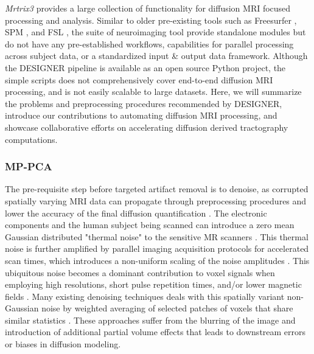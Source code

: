 \emph{Mrtrix3} provides a large collection of functionality for diffusion MRI focused processing and analysis. Similar to older pre-existing tools such as Freesurfer \cite{Fischl2012}, SPM \cite{penny_statistical_2006}, and FSL \cite{Jenkinson2012}, the suite of neuroimaging tool provide standalone modules but do not have any pre-established workflows, capabilities for parallel processing across subject data, or a standardized input \& output data framework. Although the DESIGNER pipeline is available as an open source Python project, the simple scripts does not comprehensively cover end-to-end diffusion MRI processing, and is not easily scalable to large datasets. Here, we will summarize the problems and preprocessing procedures recommended by DESIGNER, introduce our contributions to automating diffusion MRI processing, and showcase collaborative efforts on accelerating diffusion derived tractography computations.

\subsubsection{MP-PCA}
The pre-requisite step before targeted artifact removal is to denoise, as corrupted spatially varying MRI data can propagate through preprocessing procedures and lower the accuracy of the final diffusion quantification \cite{vizioli_lowering_2021}. The electronic components and the human subject being scanned can introduce a zero mean Gaussian distributed "thermal noise" to the sensitive MR scanners \cite{hoult_signal--noise_1976,edelstein_intrinsic_1986}. This thermal noise is further amplified by parallel imaging acquisition protocols for accelerated scan times, which introduces a non-uniform scaling of the noise amplitudes \cite{pruessmann_sense_1999}. This ubiquitous noise becomes a dominant contribution to voxel signals when employing high resolutions, short pulse repetition times, and/or lower magnetic fields \cite{triantafyllou_comparison_2005,triantafyllou_physiological_2011}. Many existing denoising techniques deals with this spatially variant non-Gaussian noise by weighted averaging of selected patches of voxels that share similar statistics \cite{buades_2005,coupe_fast_2006,manjon_mri_2008,orchard2008efficient,rajan_maximum_2011,foi2011noise}. These approaches suffer from the blurring of the image and introduction of additional partial volume effects that leads to downstream errors or biases in diffusion modeling. 

